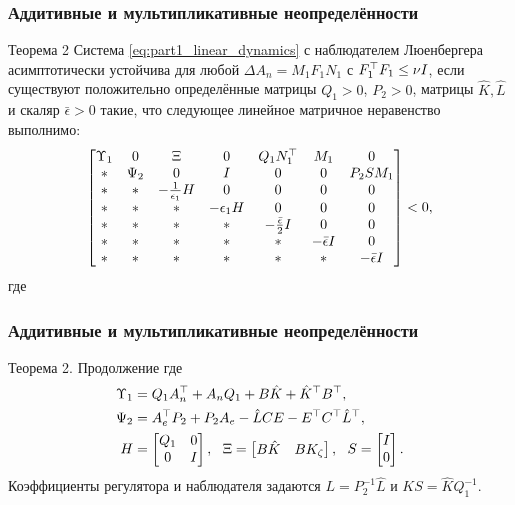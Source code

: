\begin{frame}
	\frametitle{Аддитивные и мультипликативные неопределённости}
	\begin{block}{Теорема 2}
		Система \eqref{eq:part1_linear_dynamics} с наблюдателем Люенбергера
		асимптотически устойчива для любой $\Delta {A}_n =$${M}_1{F}_1{N}_1$ с ${F}_1^\top{F}_1\leq \nu {I}$, если существуют положительно определённые матрицы ${Q}_1>0$, ${P}_2>0$, матрицы $\hat{{K}}, \hat{{L}}$ и скаляр $\bar{\epsilon}>0$ такие, что следующее линейное матричное неравенство выполнимо: 
		\begin{equation}
			\label{eq:thm2_final_LMI}
			\begin{bmatrix}    
				{\Upsilon}_1  & 0 & {\Xi} & 0 &  {Q}_1{N}_1^\top & {M}_1 & 0\\
				* & {\Psi}_2 & 0 & {I} & 0 & 0 & {P}_2{S}{M}_1\\
				* & * &  -\frac{1}{\epsilon_1}{H} & 0 & 0 &0 & 0\\
				* & * & * & -\epsilon_1{H} & 0 & 0 & 0 \\
				* & * & * & * & -\frac{\bar{\epsilon}}{2}{I} & 0 & 0 \\       * & * & * & * & *&  -\bar{\epsilon}{I} & 0 \\
				* & * & * & * & *& * &  -\bar{\epsilon}{I}
			\end{bmatrix} <0,
		\end{equation}
		где
	\end{block}
\end{frame}

\begin{frame}
	\frametitle{Аддитивные и мультипликативные неопределённости}
	\begin{block}{Теорема 2. Продолжение}
		где
		\begin{align*}
			{\Upsilon}_1&={Q}_1{A}_n\T+{A}_n{Q}_1+{B}\hat{{K}}+\hat{{K}}\T{B}\T, \\
			{\Psi}_2 &={A}_e\T{P}_2+{P}_2{A}_e-\hat{{L}}{CE}-{E}\T{C}\T\hat{{L}}\T,\\
			{H} &= \begin{bmatrix}
				{Q}_1 & 0 \\
				0 & {I}
			\end{bmatrix}, \ \ 
			{\Xi} = \begin{bmatrix}
				{B}\hat{{K}} & {B}{K}_{\zeta} \end{bmatrix}, \ \ 
			{S} = \begin{bmatrix}
				{I} \\ 0
			\end{bmatrix}.
		\end{align*}
		Коэффициенты регулятора и наблюдателя задаются ${L}={P}^{-1}_2\hat{{L}}$
		и ${KS}=\hat{{K}}{Q}^{-1}_1$.
	\end{block}
\end{frame}

